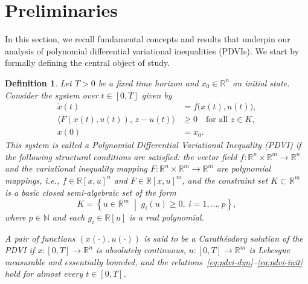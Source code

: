 \documentclass[sn-basic,Numbered]{sn-jnl}
\newcommand{\SOL}{\mathrm{SOL}}
\theoremstyle{thmstyleone}%
\newtheorem{definition}{Definition}%
\begin{document}
\section{Preliminaries}\label{sec:preliminaries}
In this section, we recall fundamental concepts and results that underpin our analysis of polynomial differential variational inequalities (PDVIs). We start by formally defining the central object of study.

\begin{definition}
\label{def:pdvi}
Let $T > 0$ be a fixed time horizon and $x_0 \in \mathbb{R}^n$ an initial state. Consider the system over $t \in [0, T]$ given by
\begin{subequations}\label{eq:pdvi-system}
\begin{align}
    \dot{x}(t) &= f\big(x(t), u(t)\big), \label{eq:pdvi-dyn} \\
    \langle F(x(t), u(t)),\, z - u(t) \rangle &\geq 0 \quad \text{for all } z \in K, \label{eq:pdvi-vi} \\
    x(0) &= x_0. \label{eq:pdvi-init}
\end{align}
\end{subequations}
This system is called a \emph{Polynomial Differential Variational Inequality} (PDVI) if the following structural conditions are satisfied: the vector field $f : \mathbb{R}^n \times \mathbb{R}^m \to \mathbb{R}^n$ and the variational inequality mapping $F : \mathbb{R}^n \times \mathbb{R}^m \to \mathbb{R}^m$ are polynomial mappings, i.e., $f \in \mathbb{R}[x, u]^n$ and $F \in \mathbb{R}[x, u]^m$, and the constraint set $K \subset \mathbb{R}^m$ is a basic closed semi-algebraic set of the form
\[
    K = \left\{ u \in \mathbb{R}^m \;\middle|\; g_i(u) \geq 0,\ i = 1, \dots, p \right\},
\]
where $p \in \mathbb{N}$ and each $g_i \in \mathbb{R}[u]$ is a real polynomial.

A pair of functions $(x(\cdot), u(\cdot))$ is said to be a \emph{Carath\'{e}odory solution} of the PDVI if $x : [0, T] \to \mathbb{R}^n$ is absolutely continuous, $u : [0, T] \to \mathbb{R}^m$ is Lebesgue measurable and essentially bounded, and the relations~\eqref{eq:pdvi-dyn}--\eqref{eq:pdvi-init} hold for almost every $t \in [0, T]$.
\end{definition}

\end{document}
